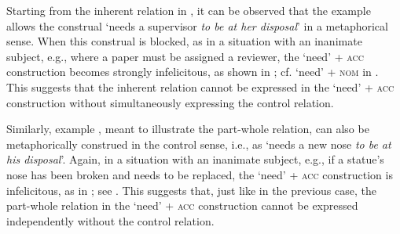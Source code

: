 \documentclass[output=paper]{langscibook}
\begin{document}
\ea
{}
\z\z

\noindent Starting from the inherent relation in , it can be observed that the example allows the construal `needs a supervisor \textit{to be at her disposal}' in a metaphorical sense. When this construal is blocked, as in a situation with an inanimate subject, e.g., where a paper must be assigned a reviewer, the `need' + \textsc{acc} construction becomes strongly infelicitous, as shown in ; cf. `need' + \textsc{nom} in . This suggests that the inherent relation cannot be expressed in the `need' + \textsc{acc} construction without simultaneously expressing the control relation.

\ea \label{inherent-inan-context}
\z\z

\noindent Similarly, example , meant to illustrate the part-whole relation, can also be metaphorically construed in the control sense, i.e., as `needs a new nose \textit{to be at his disposal}'. Again, in a situation with an inanimate subject, e.g., if a statue's nose has been broken and needs to be replaced, the `need' + \textsc{acc} construction is infelicitous, as in ; see . This suggests that, just like in the previous case, the part-whole relation in the `need' + \textsc{acc} construction cannot be expressed independently without the control relation.
\end{document}
